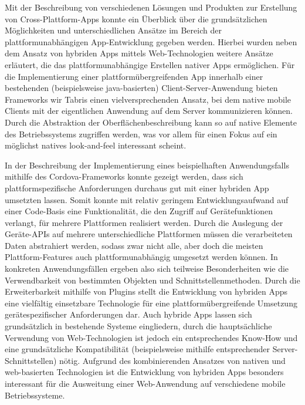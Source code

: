 
	\label{sec:schluss}



Mit der Beschreibung von verschiedenen Lösungen und Produkten zur Erstellung von Cross-Plattform-Apps konnte ein Überblick über die grundsätzlichen Möglichkeiten und unterschiedlichen Ansätze im Bereich der plattformunabhängigen App-Entwicklung gegeben werden.
Hierbei wurden neben dem Ansatz von hybriden Apps mittels Web-Technologien weitere Ansätze erläutert, die das plattformunabhängige Erstellen nativer Apps ermöglichen. 
Für die Implementierung einer plattformübergreifenden App innerhalb einer bestehenden (beispielsweise java-basierten) Client-Server-Anwendung bieten Frameworks wir Tabris einen vielversprechenden Ansatz, bei dem native mobile Clients mit der eigentlichen Anwendung auf dem Server kommunizieren können.
Durch die Abstraktion der Oberflächenbeschreibung kann so auf native Elemente des Betriebssystems zugriffen werden, was vor allem für einen Fokus auf ein möglichst natives \gls{look-and-feel} interessant scheint.

In der Beschreibung der Implementierung eines beispielhaften Anwendungsfalls mithilfe des Cordova-Frameworks konnte gezeigt werden, dass sich plattformspezifische Anforderungen durchaus gut mit einer hybriden App umsetzten lassen.
Somit konnte mit relativ geringem Entwicklungsaufwand auf einer Code-Basis eine Funktionalität, die den Zugriff auf Gerätefunktionen verlangt, für mehrere Plattformen realisiert werden.
Durch die Auslegung der Geräte-APIs auf mehrere unterschiedliche Plattformen müssen die verarbeiteten Daten abstrahiert werden, sodass zwar nicht alle, aber doch die meisten Plattform-Features auch plattformunabhängig umgesetzt werden können.
In konkreten Anwendungsfällen ergeben also sich teilweise Besonderheiten wie die Verwendbarkeit von bestimmten Objekten und Schnittstellenmethoden.
Durch die Erweiterbarkeit mithilfe von Plugins stellt die Entwicklung von hybriden Apps eine vielfältig einsetzbare Technologie für eine plattformübergreifende  Umsetzung gerätespezifischer Anforderungen dar.
Auch hybride Apps lassen sich grundsätzlich in bestehende Systeme eingliedern, durch die hauptsächliche Verwendung von Web-Technologien ist jedoch ein entsprechendes Know-How und eine grundsätzliche Kompatibilität (beispielsweise mithilfe entsprechender Server-Schnittstellen) nötig.
Aufgrund des kombinierenden Ansatzes von nativen und web-basierten Technologien ist die Entwicklung von hybriden Apps besonders interessant für die Ausweitung einer Web-Anwendung auf verschiedene mobile Betriebssysteme.

